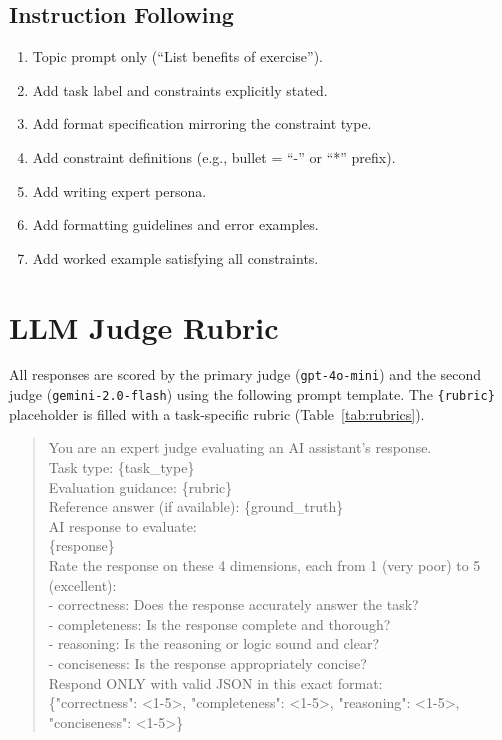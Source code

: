 \subsection{Instruction Following}
\begin{enumerate}
  \item Topic prompt only (``List benefits of exercise'').
  \item Add task label and constraints explicitly stated.
  \item Add format specification mirroring the constraint type.
  \item Add constraint definitions (e.g., bullet = ``-'' or ``*'' prefix).
  \item Add writing expert persona.
  \item Add formatting guidelines and error examples.
  \item Add worked example satisfying all constraints.
\end{enumerate}

\section{LLM Judge Rubric}
\label{app:judge}

All responses are scored by the primary judge (\texttt{gpt-4o-mini}) and
the second judge (\texttt{gemini-2.0-flash}) using the following prompt
template.
The \texttt{\{rubric\}} placeholder is filled with a task-specific rubric
(Table~\ref{tab:rubrics}).

\begin{quote}
\small
\ttfamily
You are an expert judge evaluating an AI assistant's response.\\[4pt]
Task type: \{task\_type\}\\
Evaluation guidance: \{rubric\}\\
Reference answer (if available): \{ground\_truth\}\\[4pt]
AI response to evaluate:\\
\{response\}\\[4pt]
Rate the response on these 4 dimensions, each from 1 (very poor) to 5
(excellent):\\
- correctness: Does the response accurately answer the task?\\
- completeness: Is the response complete and thorough?\\
- reasoning: Is the reasoning or logic sound and clear?\\
- conciseness: Is the response appropriately concise?\\[4pt]
Respond ONLY with valid JSON in this exact format:\\
\{"correctness": <1-5>, "completeness": <1-5>, "reasoning": <1-5>,
"conciseness": <1-5>\}
\end{quote}

